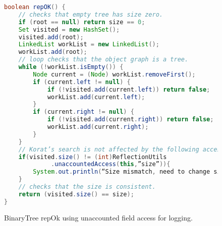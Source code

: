 \begin{figure}
\centering
\begin{lstlisting}[language=Java]
boolean repOK() {
    // checks that empty tree has size zero.
    if (root == null) return size == 0;
    Set visited = new HashSet();
    visited.add(root);
    LinkedList workList = new LinkedList();
    workList.add(root);
    // loop checks that the object graph is a tree.
    while (!workList.isEmpty()) {
        Node current = (Node) workList.removeFirst();
        if (current.left != null) {
            if (!visited.add(current.left)) return false;
            workList.add(current.left);
        }
        if (current.right != null) {
            if (!visited.add(current.right)) return false;
            workList.add(current.right);
        }
    }
    // Korat’s search is not affected by the following access.
    if(visited.size() != (int)ReflectionUtils
             .unaccountedAccess(this,”size”)){
        System.out.println(“Size mismatch, need to change size”);
    }
    // checks that the size is consistent.
    return (visited.size() == size);
}
\end{lstlisting}
\caption{BinaryTree repOk using unaccounted field access for logging.}
\label{fig:bTreeUnaccountedFieldAccess}
\end{figure}
